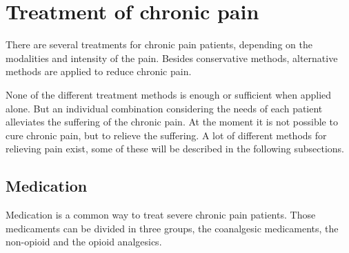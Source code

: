 

\section{Treatment of chronic pain}
There are several treatments for chronic pain patients, depending on the modalities and intensity of the pain. Besides conservative methods, alternative methods are applied to reduce chronic pain. %
\cite{marcus2009,pope2017}

None of the different treatment methods is enough or sufficient when applied alone. But an individual combination considering the needs of each patient alleviates the suffering of the chronic pain.
At the moment it is not possible to cure chronic pain, but to relieve the suffering. \cite{marcus2009,pope2017}
A lot of different methods for relieving pain exist, some of these will be described in the following subsections. 

\subsection{Medication}
Medication is a common way to treat severe chronic pain patients. %
Those medicaments can be divided in three groups, the coanalgesic medicaments, the non-opioid and the opioid analgesics. \cite{marcus2009}

